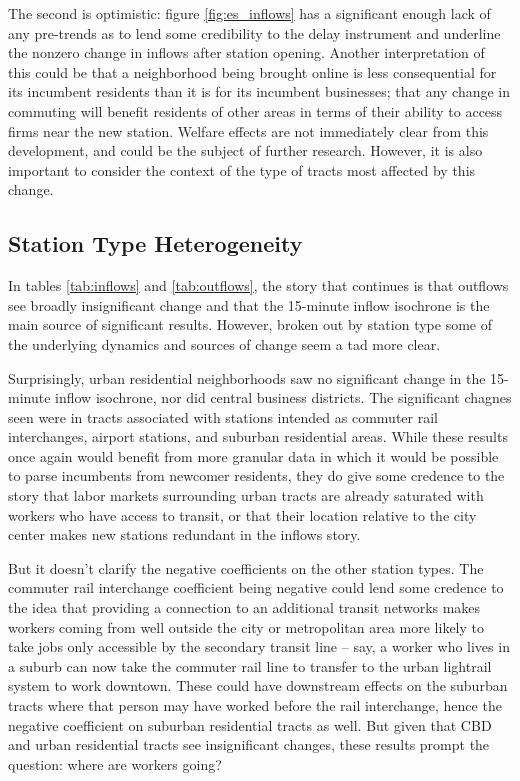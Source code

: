 \documentclass[12pt]{article}
\begin{document}
The second is optimistic: figure \ref{fig:es_inflows} has a significant enough lack of any pre-trends as to lend some credibility to the delay instrument and underline the nonzero change in inflows after station opening. Another interpretation of this could be that a neighborhood being brought online is less consequential for its incumbent residents than it is for its incumbent businesses; that any change in commuting will benefit residents of other areas in terms of their ability to access firms near the new station. Welfare effects are not immediately clear from this development, and could be the subject of further research. However, it is also important to consider the context of the type of tracts most affected by this change. 

\subsection{Station Type Heterogeneity}\label{subsec:station_type}
In tables \ref{tab:inflows} and \ref{tab:outflows}, the story that continues is that outflows see broadly insignificant change and that the 15-minute inflow isochrone is the main source of significant results. However, broken out by station type some of the underlying dynamics and sources of change seem a tad more clear. 

Surprisingly, urban residential neighborhoods saw no significant change in the 15-minute inflow isochrone, nor did central business districts. The significant chagnes seen were in tracts associated with stations intended as commuter rail interchanges, airport stations, and suburban residential areas. While these results once again would benefit from more granular data in which it would be possible to parse incumbents from newcomer residents, they do give some credence to the story that labor markets surrounding urban tracts are already saturated with workers who have access to transit, or that their location relative to the city center makes new stations redundant in the inflows story. 

But it doesn't clarify the negative coefficients on the other station types. The commuter rail interchange coefficient being negative could lend some credence to the idea that providing a connection to an additional transit networks makes workers coming from well outside the city or metropolitan area more likely to take jobs only accessible by the secondary transit line -- say, a worker who lives in a suburb can now take the commuter rail line to transfer to the urban lightrail system to work downtown. These could have downstream effects on the suburban tracts where that person may have worked before the rail interchange, hence the negative coefficient on suburban residential tracts as well. But given that CBD and urban residential tracts see insignificant changes, these results prompt the question: where are workers going? 
\end{document}
